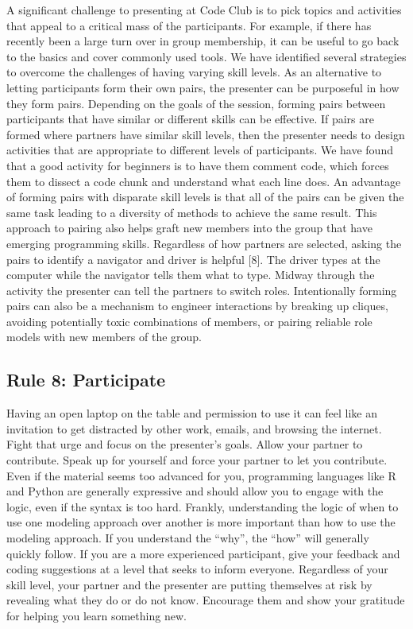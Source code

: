 \documentclass[
  11pt,
]{article}
\begin{document}
A significant challenge to presenting at Code Club is to pick topics and
activities that appeal to a critical mass of the participants. For
example, if there has recently been a large turn over in group
membership, it can be useful to go back to the basics and cover commonly
used tools. We have identified several strategies to overcome the
challenges of having varying skill levels. As an alternative to letting
participants form their own pairs, the presenter can be purposeful in
how they form pairs. Depending on the goals of the session, forming
pairs between participants that have similar or different skills can be
effective. If pairs are formed where partners have similar skill levels,
then the presenter needs to design activities that are appropriate to
different levels of participants. We have found that a good activity for
beginners is to have them comment code, which forces them to dissect a
code chunk and understand what each line does. An advantage of forming
pairs with disparate skill levels is that all of the pairs can be given
the same task leading to a diversity of methods to achieve the same
result. This approach to pairing also helps graft new members into the
group that have emerging programming skills. Regardless of how partners
are selected, asking the pairs to identify a navigator and driver is
helpful {[}8{]}. The driver types at the computer while the navigator
tells them what to type. Midway through the activity the presenter can
tell the partners to switch roles. Intentionally forming pairs can also
be a mechanism to engineer interactions by breaking up cliques, avoiding
potentially toxic combinations of members, or pairing reliable role
models with new members of the group.

\hypertarget{rule-8-participate}{%
\subsection{Rule 8: Participate}\label{rule-8-participate}}

Having an open laptop on the table and permission to use it can feel
like an invitation to get distracted by other work, emails, and browsing
the internet. Fight that urge and focus on the presenter's goals. Allow
your partner to contribute. Speak up for yourself and force your partner
to let you contribute. Even if the material seems too advanced for you,
programming languages like R and Python are generally expressive and
should allow you to engage with the logic, even if the syntax is too
hard. Frankly, understanding the logic of when to use one modeling
approach over another is more important than how to use the modeling
approach. If you understand the ``why'', the ``how'' will generally
quickly follow. If you are a more experienced participant, give your
feedback and coding suggestions at a level that seeks to inform
everyone. Regardless of your skill level, your partner and the presenter
are putting themselves at risk by revealing what they do or do not know.
Encourage them and show your gratitude for helping you learn something
new.
\end{document}
